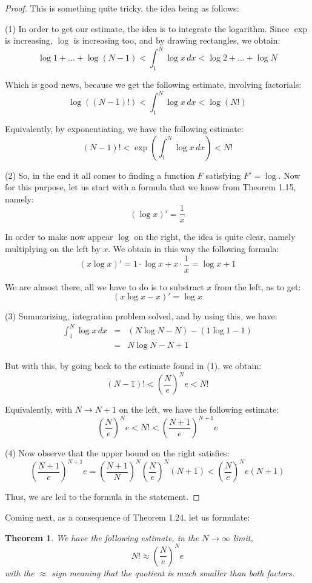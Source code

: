 \documentclass[12pt]{amsbook}
\newtheorem{theorem}{Theorem}[chapter]
\begin{document}
\begin{proof}
This is something quite tricky, the idea being as follows:

\medskip

(1) In order to get our estimate, the idea is to integrate the logarithm. Since $\exp$ is increasing, $\log$ is increasing too, and by drawing rectangles, we obtain:
$$\log 1+\ldots+\log(N-1)<\int_1^N\log x\,dx<\log 2+\ldots+\log N$$

Which is good news, because we get the following estimate, involving factorials:
$$\log((N-1)!)<\int_1^N\log x\,dx<\log(N!)$$

Equivalently, by exponentiating, we have the following estimate:
$$(N-1)!<\exp\left(\int_1^N\log x\,dx\right)<N!$$

(2) So, in the end it all comes to finding a function $F$ satisfying $F'=\log$. Now for this purpose, let us start with a formula that we know from Theorem 1.15, namely:
$$(\log x)'=\frac{1}{x}$$

In order to make now appear $\log$ on the right, the idea is quite clear, namely multiplying on the left by $x$. We obtain in this way the following formula:
$$(x\log x)'=1\cdot\log x+x\cdot\frac{1}{x}=\log x+1$$

We are almost there, all we have to do is to substract $x$ from the left, as to get:
$$(x\log x-x)'=\log x$$

(3) Summarizing, integration problem solved, and by using this, we have:
\begin{eqnarray*}
\int_1^N\log x\,dx
&=&(N\log N-N)-(1\log 1-1)\\
&=&N\log N-N+1
\end{eqnarray*}

But with this, by going back to the estimate found in (1), we obtain:
$$(N-1)!<\left(\frac{N}{e}\right)^Ne<N!$$

Equivalently, with $N\to N+1$ on the left, we have the following estimate:
$$\left(\frac{N}{e}\right)^Ne<N!<\left(\frac{N+1}{e}\right)^{N+1}e$$

(4) Now observe that the upper bound on the right satisfies:
$$\left(\frac{N+1}{e}\right)^{N+1}e
=\left(\frac{N+1}{N}\right)^N\left(\frac{N}{e}\right)^N(N+1)
<\left(\frac{N}{e}\right)^Ne(N+1)$$

Thus, we are led to the formula in the statement.
\end{proof}

Coming next, as a consequence of Theorem 1.24, let us formulate:

\begin{theorem}
We have the following estimate, in the $N\to\infty$ limit,
$$N!\approx \left(\frac{N}{e}\right)^Ne$$
with the $\approx$ sign meaning that the quotient is much smaller than both factors.
\end{theorem}
\end{document}
